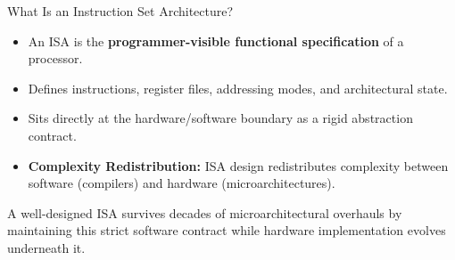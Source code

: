 \documentclass[aspectratio=169,11pt,t]{beamer}
\newcommand{\key}[1]{\textbf{#1}}
\begin{document}
\begin{frame}{What Is an Instruction Set Architecture?}
\vfill
\begin{itemize}\setlength{\itemsep}{7pt}
  \item An ISA is the \key{programmer-visible functional specification} of a processor.
  \item Defines instructions, register files, addressing modes, and architectural state.
  \item Sits directly at the hardware/software boundary as a rigid abstraction contract.
  \item \key{Complexity Redistribution:} ISA design redistributes complexity between software (compilers) and hardware (microarchitectures).
\end{itemize}

\vfill
\centering
{}

\vfill
\small
A well-designed ISA survives decades of microarchitectural overhauls by maintaining this strict software contract while hardware implementation evolves underneath it.
\vfill
\end{frame}











\end{document}

